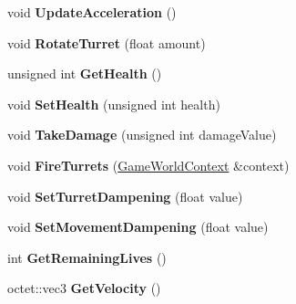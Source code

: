 \begin{DoxyCompactItemize}
\item 
\hypertarget{class_arena_1_1_player_a376aa62b0d4d2bf358155300f2be8525}{void {\bfseries Update\+Acceleration} ()}\label{class_arena_1_1_player_a376aa62b0d4d2bf358155300f2be8525}

\item 
\hypertarget{class_arena_1_1_player_adc499cdfaba72bce0fe200ddb993adb3}{void {\bfseries Rotate\+Turret} (float amount)}\label{class_arena_1_1_player_adc499cdfaba72bce0fe200ddb993adb3}

\item 
\hypertarget{class_arena_1_1_player_a105dfdea93133a3e952d204b73677fd6}{unsigned int {\bfseries Get\+Health} ()}\label{class_arena_1_1_player_a105dfdea93133a3e952d204b73677fd6}

\item 
\hypertarget{class_arena_1_1_player_a1a9e5f5835b1d2daf954cadf7a2c13c0}{void {\bfseries Set\+Health} (unsigned int health)}\label{class_arena_1_1_player_a1a9e5f5835b1d2daf954cadf7a2c13c0}

\item 
\hypertarget{class_arena_1_1_player_ae059c8218e19ef39447c4d6325be79b9}{void {\bfseries Take\+Damage} (unsigned int damage\+Value)}\label{class_arena_1_1_player_ae059c8218e19ef39447c4d6325be79b9}

\item 
\hypertarget{class_arena_1_1_player_a30b0f9546f67c561f40f46f18f386f4b}{void {\bfseries Fire\+Turrets} (\hyperlink{struct_arena_1_1_game_world_context}{Game\+World\+Context} \&context)}\label{class_arena_1_1_player_a30b0f9546f67c561f40f46f18f386f4b}

\item 
\hypertarget{class_arena_1_1_player_a84193884efbb3cec45ab0d3364cacc15}{void {\bfseries Set\+Turret\+Dampening} (float value)}\label{class_arena_1_1_player_a84193884efbb3cec45ab0d3364cacc15}

\item 
\hypertarget{class_arena_1_1_player_aeb4cdcd09fd10f1d9117dc59ecf9985d}{void {\bfseries Set\+Movement\+Dampening} (float value)}\label{class_arena_1_1_player_aeb4cdcd09fd10f1d9117dc59ecf9985d}

\item 
\hypertarget{class_arena_1_1_player_a9b32bddf5f59ed88b9efd485e15ce347}{int {\bfseries Get\+Remaining\+Lives} ()}\label{class_arena_1_1_player_a9b32bddf5f59ed88b9efd485e15ce347}

\item 
\hypertarget{class_arena_1_1_player_ab093919e83236c721beeae9f9d29621b}{octet\+::vec3 {\bfseries Get\+Velocity} ()}\label{class_arena_1_1_player_ab093919e83236c721beeae9f9d29621b}


\end{DoxyCompactItemize}
